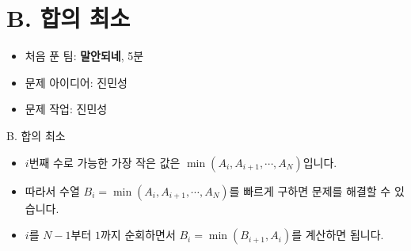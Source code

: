 \def\probno{B}
\def\probtitle{합의 최소}

\section{\probno{}. \probtitle{}}

\begin{frame} %
    \sectiontitle{\probno{}}{\probtitle{}}
    \begin{itemize}
        \item 처음 푼 팀: \textbf{말안되네}, 5분
        \item 문제 아이디어: 진민성
        \item 문제 작업: 진민성
    \end{itemize}
\end{frame}

\begin{frame}{\probno{}. \probtitle{}}
    \begin{itemize}
        \item $i$번째 수로 가능한 가장 작은 값은 $\min(A_i, A_{i+1},\cdots,A_N)$입니다.
        \item 따라서 수열 $B_i = \min(A_i, A_{i+1}, \cdots, A_N)$를 빠르게 구하면 문제를 해결할 수 있습니다.
        \item $i$를 $N-1$부터 $1$까지 순회하면서 $B_i = \min(B_{i+1}, A_i)$를 계산하면 됩니다.
    \end{itemize}
\end{frame}